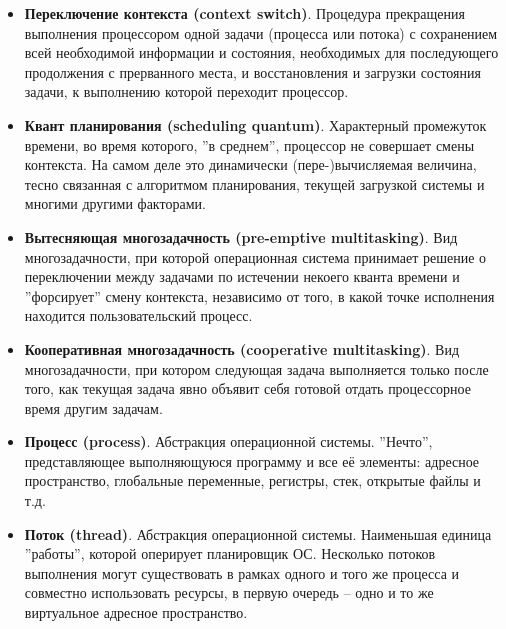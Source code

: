 \documentclass[a4paper, 12pt]{extarticle}
\begin{document}
\begin{itemize}
	\item \textbf{Переключение контекста (context switch)}. Процедура прекращения выполнения процессором одной задачи (процесса или потока) с сохранением всей необходимой информации и состояния, необходимых для последующего продолжения с прерванного места, и восстановления и загрузки состояния задачи, к выполнению которой переходит процессор.

	\item \textbf{Квант планирования (scheduling quantum)}. Характерный промежуток времени, во время которого, ''в среднем'', процессор не совершает смены контекста. На самом деле это динамически (пере-)вычисляемая величина, тесно связанная с алгоритмом планирования, текущей загрузкой системы и многими другими факторами.

	\item \textbf{Вытесняющая многозадачность (pre-emptive multitasking)}. Вид многозадачности, при которой операционная система принимает решение о переключении между задачами по истечении некоего кванта времени и ''форсирует'' смену контекста, независимо от того, в какой точке исполнения находится пользовательский процесс.

	\item \textbf{Кооперативная многозадачность (cooperative multitasking)}. Вид многозадачности, при котором следующая задача выполняется только после того, как текущая задача явно объявит себя готовой отдать процессорное время другим задачам.


	\item \textbf{Процесс (process)}. Абстракция операционной системы. ''Нечто'', представляющее выполняющуюся программу и все её элементы: адресное пространство, глобальные переменные, регистры, стек, открытые файлы и т.д. 

	\item \textbf{Поток (thread)}. Абстракция операционной системы. Наименьшая единица ''работы'', которой оперирует планировщик ОС. Несколько потоков выполнения могут существовать в рамках одного и того же процесса и совместно использовать ресурсы, в первую очередь -- одно и то же виртуальное адресное пространство.
	

\end{itemize}
\end{document}
